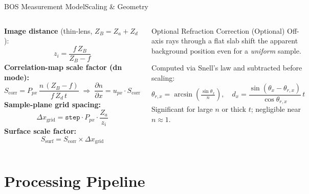 \documentclass[9pt, aspectratio=169]{beamer}
\begin{document}
\begin{frame}{BOS Measurement Model}{Scaling \& Geometry}
  \begin{columns}[t]
      \textbf{Image distance} (thin-lens, $Z_B = Z_a + Z_d$):
      \[
        z_i = \frac{f\,Z_B}{Z_B - f}
      \]
      \textbf{Correlation-map scale factor (dn mode):}
      \[
        S_{\mathrm{corr}} = P_{px}\,\frac{n\,(Z_B - f)}{f\,Z_d\,t}
        \;\Rightarrow\;
        \frac{\partial n}{\partial x} = u_{px}\cdot S_{\mathrm{corr}}
      \]
      \textbf{Sample-plane grid spacing:}
      \[
        \Delta x_{\mathrm{grid}} = \texttt{step}\cdot P_{px}\cdot\frac{Z_a}{z_i}
      \]
      \textbf{Surface scale factor:}
      \[
        S_{\mathrm{surf}} = S_{\mathrm{corr}}\times\Delta x_{\mathrm{grid}}
      \]
      \begin{block}{Optional Refraction Correction (Optional)}
        Off-axis rays through a flat slab shift the apparent background position even for a \emph{uniform} sample.
        \vspace{0.3em}

        Computed via Snell's law and subtracted before scaling:
        \[
          \theta_{r,x} = \arcsin\!\!\left(\tfrac{\sin\theta_x}{n}\right),\quad
          d_x = \frac{\sin(\theta_x - \theta_{r,x})}{\cos\theta_{r,x}}\,t
        \]
        Significant for large $n$ or thick $t$; negligible near $n\approx1$.
      \end{block}
  \end{columns}
\end{frame}

\section{Processing Pipeline}
\end{document}
